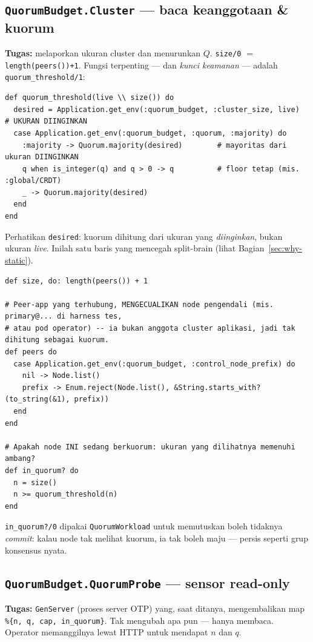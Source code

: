 \documentclass[11pt]{article}
\newcommand{\code}[1]{\texttt{\small #1}}
\begin{document}
\subsection{\texttt{QuorumBudget.Cluster} --- baca keanggotaan \& kuorum}
\label{sec:mod-cluster}
\textbf{Tugas:} melaporkan ukuran cluster dan menurunkan $Q$. \code{size/0} $=$
\code{length(peers())+1}. Fungsi terpenting --- dan \emph{kunci keamanan} --- adalah
\code{quorum\_threshold/1}:
\begin{lstlisting}[style=ex]
def quorum_threshold(live \\ size()) do
  desired = Application.get_env(:quorum_budget, :cluster_size, live)  # UKURAN DIINGINKAN
  case Application.get_env(:quorum_budget, :quorum, :majority) do
    :majority -> Quorum.majority(desired)        # mayoritas dari ukuran DIINGINKAN
    q when is_integer(q) and q > 0 -> q          # floor tetap (mis. :global/CRDT)
    _ -> Quorum.majority(desired)
  end
end
\end{lstlisting}
Perhatikan \code{desired}: kuorum dihitung dari ukuran yang \emph{diinginkan}, bukan ukuran \emph{live}.
Inilah satu baris yang mencegah split-brain (lihat Bagian~\ref{sec:why-static}).
\begin{lstlisting}[style=ex]
def size, do: length(peers()) + 1

# Peer-app yang terhubung, MENGECUALIKAN node pengendali (mis. primary@... di harness tes,
# atau pod operator) -- ia bukan anggota cluster aplikasi, jadi tak dihitung sebagai kuorum.
def peers do
  case Application.get_env(:quorum_budget, :control_node_prefix) do
    nil -> Node.list()
    prefix -> Enum.reject(Node.list(), &String.starts_with?(to_string(&1), prefix))
  end
end

# Apakah node INI sedang berkuorum: ukuran yang dilihatnya memenuhi ambang?
def in_quorum? do
  n = size()
  n >= quorum_threshold(n)
end
\end{lstlisting}
\code{in\_quorum?/0} dipakai \code{QuorumWorkload} untuk memutuskan boleh tidaknya \emph{commit}: kalau
node tak melihat kuorum, ia tak boleh maju --- persis seperti grup konsensus nyata.

\subsection{\texttt{QuorumBudget.QuorumProbe} --- sensor read-only}
\textbf{Tugas:} \code{GenServer} (proses server OTP) yang, saat ditanya, mengembalikan map
\code{\%\{n, q, cap, in\_quorum\}}. Tak mengubah apa pun --- hanya membaca. Operator memanggilnya lewat
HTTP untuk mendapat $n$ dan $q$.
\end{document}
